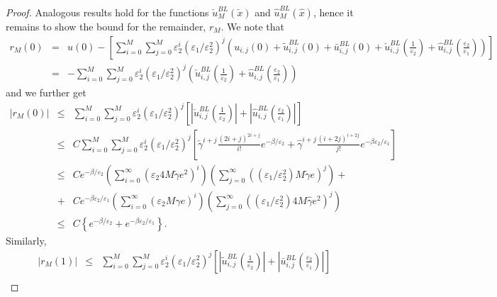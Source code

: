 \documentclass[12pt]{article}
\begin{document}
\begin{proof}
Analogous results hold for the functions $\check{u}_M^{BL}(\check{x})$ and $\hat{u}_M^{BL}(\hat{x})$, hence it remains to show the bound for the remainder, $r_M$. We note that
%
\begin{eqnarray*}
r_M(0) &=& u(0) - \left[ \sum_{i=0}^{M} \sum_{j=0}^{M} \varepsilon _{2}^{i} \left( \varepsilon _{1} / \varepsilon _{2}^{2} \right)^{j} \left( u_{i,j}(0) + \tilde{u}^{BL}_{i,j}(0) + \bar{u}^{BL}_{i,j}(0) + \check{u}^{BL}_{i,j}\left( \frac{1}{\varepsilon _{2}} \right) + \hat{u}^{BL}_{i,j}\left( \frac{\varepsilon _{2}}{\varepsilon _{1}} \right) \right) \right] \\
&=& - \sum_{i=0}^{M} \sum_{j=0}^{M} \varepsilon _{2}^{i} \left( \varepsilon _{1} / \varepsilon _{2}^{2} \right)^{j} \left( \check{u}^{BL}_{i,j}\left( \frac{1}{\varepsilon _{2}} \right) + \hat{u}^{BL}_{i,j}\left( \frac{\varepsilon _{2}}{\varepsilon _{1}} \right) \right)
\end{eqnarray*}
%
and we further get
%
\begin{eqnarray*}
|r_M(0)| &\leq& \sum_{i=0}^{M} \sum_{j=0}^{M} \varepsilon _{2}^{i} \left( \varepsilon _{1} / \varepsilon _{2}^{2} \right)^{j} \left[ \left\vert \check{u}^{BL}_{i,j}\left( \frac{1}{\varepsilon _{2}} \right) \right\vert + \left\vert \hat{u}^{BL}_{i,j}\left( \frac{\varepsilon _{2}}{\varepsilon _{1}} \right) \right\vert \right] \\
&\leq& C \sum_{i=0}^{M} \sum_{j=0}^{M} \varepsilon _{2}^{i} \left( \varepsilon _{1} / \varepsilon _{2}^{2} \right)^{j} \left[ \check{\gamma}^{i+j} \frac{(2i+j)^{2i+j}}{i!} e^{-\beta / \varepsilon _{2}} + \hat{\gamma}^{i+j} \frac{(i+2j)^{i+2j}}{j!} e^{-\beta \varepsilon _{2} / \varepsilon _{1}} \right] \\
&\leq& C e^{-\beta / \varepsilon _{2}} \left( \sum_{i=0}^{\infty} (\varepsilon_2 4M \check{\gamma} e^2)^i \right) \left( \sum_{j=0}^{\infty} ((\varepsilon_1 / \varepsilon_2^2) M \check{\gamma} e)^j \right) + \\
&+& C e^{-\beta \varepsilon _{2} / \varepsilon _{1}} \left( \sum_{i=0}^{\infty} (\varepsilon_2 M \hat{\gamma} e)^i \right) \left( \sum_{j=0}^{\infty} ((\varepsilon_1 / \varepsilon_2^2) 4M \hat{\gamma} e^2)^j \right) \\
&\leq& C \left\{ e^{-\beta / \varepsilon _{2}} + e^{-\beta \varepsilon _{2} / \varepsilon _{1}} \right\}.
\end{eqnarray*}
%
Similarly,
%
\begin{eqnarray*}
|r_M(1)| &\leq& \sum_{i=0}^{M} \sum_{j=0}^{M} \varepsilon _{2}^{i} \left( \varepsilon _{1} / \varepsilon _{2}^{2} \right)^{j} \left[ \left\vert \tilde{u}^{BL}_{i,j}\left( \frac{1}{\varepsilon _{2}} \right) \right\vert + \left\vert \bar{u}^{BL}_{i,j}\left( \frac{\varepsilon _{2}}{\varepsilon _{1}} \right) \right\vert \right] \\

\end{eqnarray*}
\end{proof}
\end{document}

